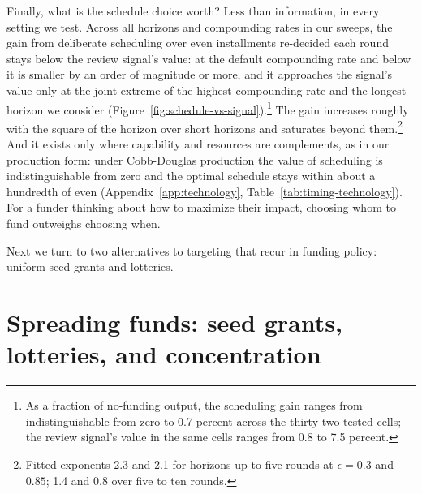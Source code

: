 \documentclass[article, 11pt, reqno]{amsart}
\theoremstyle{named}
\begin{document}
Finally, what is the schedule choice worth? Less than information, in every setting we
test. Across all horizons and compounding rates in our sweeps, the gain from
deliberate scheduling over even installments re-decided each round stays below the
review signal's value: at the default compounding rate and below it is smaller by an
order of magnitude or more, and it approaches the signal's value only at the joint
extreme of the highest compounding rate and the longest horizon we consider
(Figure~\ref{fig:schedule-vs-signal}).\footnote{As a fraction of no-funding output,
the scheduling gain ranges from indistinguishable from zero to 0.7 percent across the
thirty-two tested cells; the review signal's value in the same cells ranges from 0.8
to 7.5 percent.} The gain increases roughly with the square of the horizon over short
horizons and saturates beyond them.\footnote{Fitted exponents 2.3 and 2.1 for horizons
up to five rounds at $\epsilon = 0.3$ and $0.85$; 1.4 and 0.8 over five to ten
rounds.} And it exists only where capability and resources are complements, as in our
production form: under Cobb-Douglas production the value of scheduling is
indistinguishable from zero and the optimal schedule stays within about a hundredth of
even (Appendix~\ref{app:technology}, Table~\ref{tab:timing-technology}). For a funder thinking about how to maximize their impact, choosing whom to fund
outweighs choosing when.



Next we turn to two alternatives to targeting that recur in funding policy: uniform
seed grants and lotteries.

\section{Spreading funds: seed grants, lotteries, and concentration}\label{sec:egalitarian}
\end{document}

